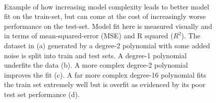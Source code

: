 \begin{figure}
	 \\
	\caption{Example of how increasing model complexity leads to better model fit on the train-set, but can come at the cost of increasingly worse performance on the test-set. Model fit here is measured visually and in terms of mean-squared-error (MSE) and R squared ($R^2$). The dataset in (a) generated by a degree-2 polynomial with some added noise is split into train and test sets. A degree-1 polynomial underfits the data (b). A more complex degree-2 polynomial improves the fit (c). A far more complex degree-16 polynomial fits the train set extremely well but is overfit as evidenced by its poor test set performance (d).}
	\label{fig:overfitting_example}
\end{figure}

